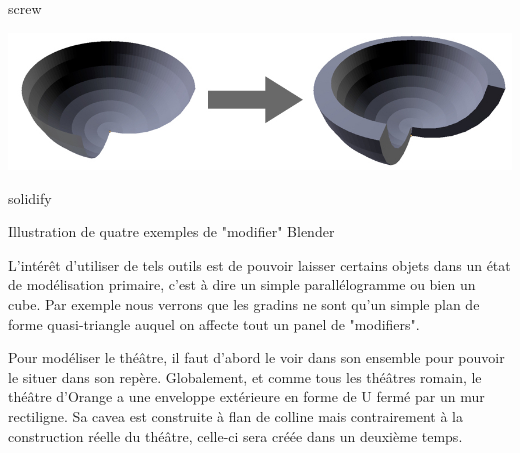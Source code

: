 \begin{figureth}
\begin{subfigureth}{0.45\textwidth}
		\caption{\gls{screw}}
	\end{subfigureth}
	\qquad
	\begin{subfigureth}{0.45\textwidth}
		\includegraphics[width=\linewidth]{images/solidify}
		\caption{\gls{solidify}}
	\end{subfigureth}
\caption{Illustration de quatre exemples de "modifier" Blender}	
\end{figureth}		

L'intérêt d'utiliser de tels outils est de pouvoir laisser certains objets dans un état de modélisation primaire, c'est à dire un simple parallélogramme ou bien un cube. Par exemple nous verrons que les gradins ne sont qu'un simple plan de forme quasi-triangle auquel on affecte tout un panel de "modifiers".

Pour modéliser le théâtre, il faut d'abord le voir dans son ensemble pour pouvoir le situer dans son repère. Globalement, et comme tous les théâtres romain, le théâtre d'Orange a une enveloppe extérieure en forme de U fermé par un mur rectiligne. Sa cavea est construite à flan de colline mais contrairement à la construction réelle du théâtre, celle-ci sera créée dans un deuxième temps. 

